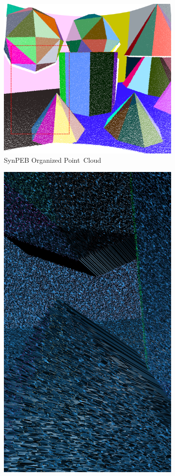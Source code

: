 \begin{figure}[ht]

  \begin{subfigure}[t]{.45\linewidth}
    \centering\includegraphics[width=.75\linewidth]{chapter_3_polylidar3d/imgs/synpeb_var4_pcd_cropped_outline.png}
    \caption{\label{fig:ch3_synpeb_a}SynPEB Organized Point~Cloud}
  \end{subfigure}
  \hfill
  \begin{subfigure}[t]{.23\linewidth}
    \centering\includegraphics[width=.75\linewidth]{chapter_3_polylidar3d/imgs/synpeb_var4_mesh_cropped.png}

\end{subfigure}
\end{figure}
